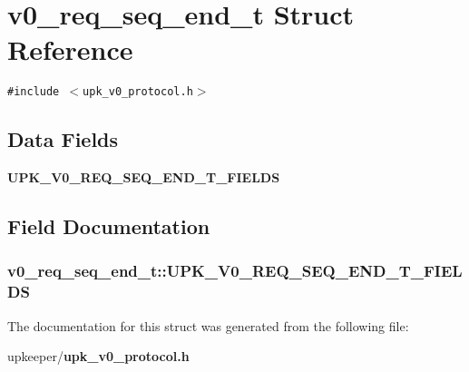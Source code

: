 \section{v0\_\-req\_\-seq\_\-end\_\-t Struct Reference}
\label{structv0__req__seq__end__t}
{\tt \#include $<$upk\_\-v0\_\-protocol.h$>$}

\subsection*{Data Fields}
\begin{CompactItemize}
\item 
\bf{UPK\_\-V0\_\-REQ\_\-SEQ\_\-END\_\-T\_\-FIELDS}
\end{CompactItemize}


\subsection{Field Documentation}
\subsubsection{\setlength{\rightskip}{0pt plus 5cm}\bf{v0\_\-req\_\-seq\_\-end\_\-t::UPK\_\-V0\_\-REQ\_\-SEQ\_\-END\_\-T\_\-FIELDS}}\label{structv0__req__seq__end__t_ccc6f4bb5bd08eaefd2f47a152814f59}




The documentation for this struct was generated from the following file:\begin{CompactItemize}
\item 
upkeeper/\bf{upk\_\-v0\_\-protocol.h}\end{CompactItemize}
